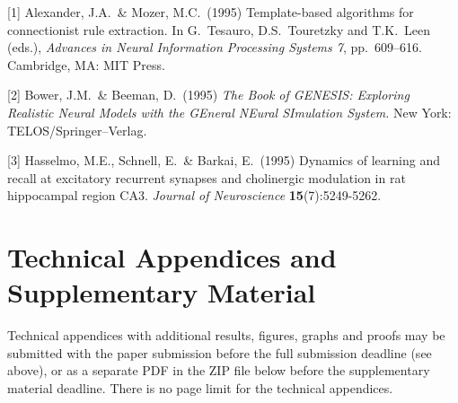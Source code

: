 \documentclass{article}
\begin{document}
{
\small


[1] Alexander, J.A.\ \& Mozer, M.C.\ (1995) Template-based algorithms for
connectionist rule extraction. In G.\ Tesauro, D.S.\ Touretzky and T.K.\ Leen
(eds.), {\it Advances in Neural Information Processing Systems 7},
pp.\ 609--616. Cambridge, MA: MIT Press.


[2] Bower, J.M.\ \& Beeman, D.\ (1995) {\it The Book of GENESIS: Exploring
  Realistic Neural Models with the GEneral NEural SImulation System.}  New York:
TELOS/Springer--Verlag.


[3] Hasselmo, M.E., Schnell, E.\ \& Barkai, E.\ (1995) Dynamics of learning and
recall at excitatory recurrent synapses and cholinergic modulation in rat
hippocampal region CA3. {\it Journal of Neuroscience} {\bf 15}(7):5249-5262.
}



\appendix

\section{Technical Appendices and Supplementary Material}
Technical appendices with additional results, figures, graphs and proofs may be submitted with the paper submission before the full submission deadline (see above), or as a separate PDF in the ZIP file below before the supplementary material deadline. There is no page limit for the technical appendices.

\end{document}
